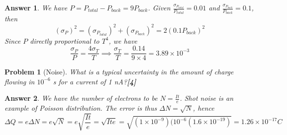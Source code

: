 \documentclass[a4paper]{article}
\newtheorem{ans}{Answer}[subsection]
\theoremstyle{new}
\newtheorem{qns}{Problem}[subsection]
\begin{document}
\begin{ans}
We have $P=P_{total}-P_{back}=9P_{back}$. Given $\frac{\sigma_{P_{total}}}{P_{total}}=0.01$ and $\frac{\sigma_{P_{back}}}{P_{back}}=0.1$, then
$$(\sigma_P)^2=(\sigma_{P_{total}})^2+(\sigma_{P_{back}})^2=2(0.1P_{back})^2$$
Since $P$ directly proportional to $T^4$, we have
$$\frac{\sigma_P}{P}=\frac{4\sigma_T}{T}\implies\frac{\sigma_T}{T}=\frac{0.14}{9\times 4}=3.89\times10^{-3}$$
\end{ans}
\begin{qns}[Noise]
What is a typical uncertainty in the amount of charge flowing in $10^{-6}$ s for a current of 1 nA?\hfill\textbf{[4]}
\end{qns}
\begin{ans}
We have the number of electrons to be $N=\frac{It}{e}$. Shot noise is an example of Poisson distribution. The error is thus $\Delta N=\sqrt{N}$, hence
$$\Delta Q=e\Delta N=e\sqrt{N}=e\sqrt{\frac{It}{e}}=\sqrt{Ite}=\sqrt{(1\times10^{-9})(10^{-6}(1.6\times10^{-19})}=1.26\times10^{-17}C$$
\end{ans}
\end{document}
